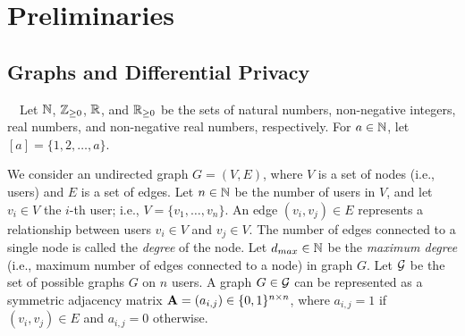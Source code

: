 \section{Preliminaries}
\label{sec:preliminaries}

\subsection{Graphs and Differential Privacy}
\label{sub:graphs_CDP}
~~Let $\mathbb{N}$, $\mathbb{Z}_{\ge0}$, $\mathbb{R}$, and $\mathbb{R}_{\ge0}$ be the sets of natural numbers, non-negative integers, real numbers, and non-negative real numbers, respectively. 
For $a \in \mathbb{N}$, let $[a] = \{1, 2, \ldots, a\}$. 

We consider an undirected graph $G=(V,E)$, where 
$V$ is a set of nodes (i.e., users) and $E$ is a set of edges. 
Let $n \in \mathbb{N}$ be the number of users in $V$, and let $v_i \in V$ the $i$-th user; i.e., $V=\{v_1,\ldots,v_n\}$. 
An edge $(v_i, v_j) \in E$ represents a relationship between users $v_i \in V$ and $v_j \in V$. 
The number of edges connected to a single node is called the \textit{degree} of the node. 
Let $d_{max} \in \mathbb{N}$ be the \textit{maximum degree} (i.e., maximum number of edges connected to a node) in graph $G$. 
Let $\mathcal{G}$ be the set of possible graphs 
$G$ on $n$ users. 
A graph $G \in \mathcal{G}$ can be represented as a symmetric adjacency matrix $\mathbf{A}=(a_{i,j}) \in \{0,1\}^{n \times n}$, where $a_{i,j}=1$ if $(v_i,v_j) \in E$ and $a_{i,j}=0$ otherwise.

